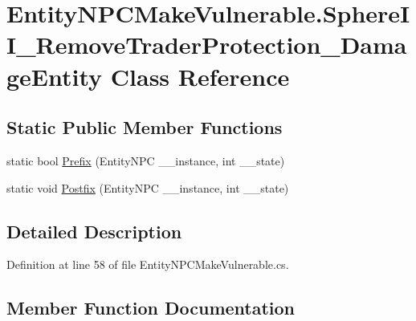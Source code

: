 \hypertarget{class_entity_n_p_c_make_vulnerable_1_1_sphere_i_i___remove_trader_protection___damage_entity}{}\section{Entity\+N\+P\+C\+Make\+Vulnerable.\+Sphere\+I\+I\+\_\+\+Remove\+Trader\+Protection\+\_\+\+Damage\+Entity Class Reference}
\label{class_entity_n_p_c_make_vulnerable_1_1_sphere_i_i___remove_trader_protection___damage_entity}
\subsection*{Static Public Member Functions}
\begin{DoxyCompactItemize}
\item 
static bool \mbox{\hyperlink{class_entity_n_p_c_make_vulnerable_1_1_sphere_i_i___remove_trader_protection___damage_entity_a65a17f6017e445cb078bdb1e2e76a69b}{Prefix}} (Entity\+N\+PC \+\_\+\+\_\+instance, int \+\_\+\+\_\+state)
\item 
static void \mbox{\hyperlink{class_entity_n_p_c_make_vulnerable_1_1_sphere_i_i___remove_trader_protection___damage_entity_af5ac0b7ee04c46f0c1657536d0d7daa7}{Postfix}} (Entity\+N\+PC \+\_\+\+\_\+instance, int \+\_\+\+\_\+state)
\end{DoxyCompactItemize}


\subsection{Detailed Description}


Definition at line 58 of file Entity\+N\+P\+C\+Make\+Vulnerable.\+cs.



\subsection{Member Function Documentation}
\mbox{\label{class_entity_n_p_c_make_vulnerable_1_1_sphere_i_i___remove_trader_protection___damage_entity_af5ac0b7ee04c46f0c1657536d0d7daa7}} 
